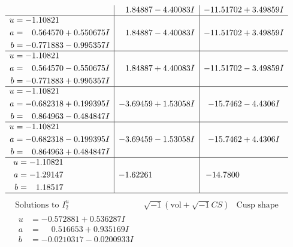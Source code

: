 \documentclass[1p]{elsarticle_modified}
\theoremstyle{definition}
\newcommand{\I}{\sqrt{-1}}
\begin{document}
$$\begin{array}{c|c|c}
 & \phantom{-}1.84887 - 4.40083 I & -11.51702 + 3.49859 I \\ \hline\begin{aligned}
u &= -1.10821\phantom{ +0.000000I} \\
a &= \phantom{-}0.564570 + 0.550675 I \\
b &= -0.771883 - 0.995357 I\end{aligned}
 & \phantom{-}1.84887 - 4.40083 I & -11.51702 + 3.49859 I \\ \hline\begin{aligned}
u &= -1.10821\phantom{ +0.000000I} \\
a &= \phantom{-}0.564570 - 0.550675 I \\
b &= -0.771883 + 0.995357 I\end{aligned}
 & \phantom{-}1.84887 + 4.40083 I & -11.51702 - 3.49859 I \\ \hline\begin{aligned}
u &= -1.10821\phantom{ +0.000000I} \\
a &= -0.682318 + 0.199395 I \\
b &= \phantom{-}0.864963 - 0.484847 I\end{aligned}
 & -3.69459 + 1.53058 I & -15.7462 - 4.4306 I \\ \hline\begin{aligned}
u &= -1.10821\phantom{ +0.000000I} \\
a &= -0.682318 - 0.199395 I \\
b &= \phantom{-}0.864963 + 0.484847 I\end{aligned}
 & -3.69459 - 1.53058 I & -15.7462 + 4.4306 I \\ \hline\begin{aligned}
u &= -1.10821\phantom{ +0.000000I} \\
a &= -1.29147\phantom{ +0.000000I} \\
b &= \phantom{-}1.18517\phantom{ +0.000000I}\end{aligned}
 & -1.62261\phantom{ +0.000000I} & -14.7800\phantom{ +0.000000I}\\
 \hline 
 \end{array}$$\newpage$$\begin{array}{c|c|c}  
\text{Solutions to }I^u_{2}& \I (\text{vol} + \sqrt{-1}CS) & \text{Cusp shape}\\
 \hline 
\begin{aligned}
u &= -0.572881 + 0.536287 I \\
a &= \phantom{-}0.516653 + 0.935169 I \\
b &= -0.0210317 - 0.0200933 I\end{aligned}

\end{array}$$
\end{document}
